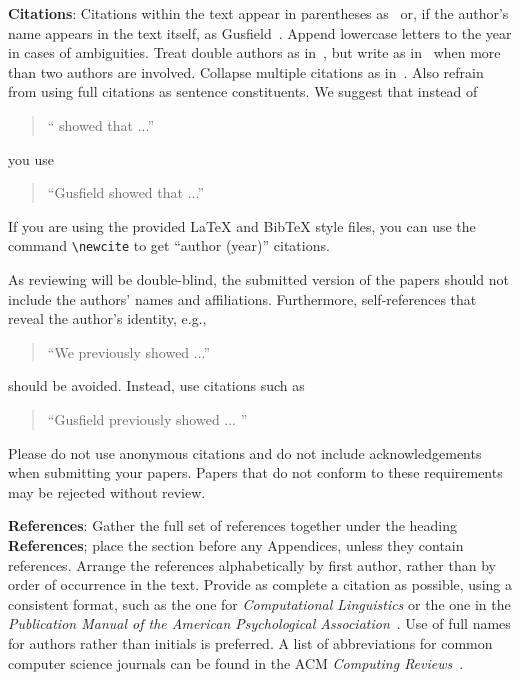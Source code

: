 \documentclass[11pt]{article}
\begin{document}
{\bf Citations}: Citations within the text appear
in parentheses as~\cite{Gusfield:97} or, if the author's name appears in
the text itself, as Gusfield~. Append lowercase letters to the year in cases of ambiguities. Treat double authors as in~\cite{Aho:72}, but write as in~\cite{Chandra:81} when more than two authors are involved. Collapse multiple citations as in~\cite{Gusfield:97,Aho:72}. Also refrain from using full citations as sentence constituents. We suggest that instead of
\begin{quote}
  ``\cite{Gusfield:97} showed that ...''
\end{quote}
you use
\begin{quote}
``Gusfield    showed that ...''
\end{quote}

If you are using the provided \LaTeX{} and Bib\TeX{} style files, you
can use the command \verb|\newcite| to get ``author (year)'' citations.

As reviewing will be double-blind, the submitted version of the papers should not include the
authors' names and affiliations. Furthermore, self-references that
reveal the author's identity, e.g.,
\begin{quote}
``We previously showed \cite{Gusfield:97} ...''
\end{quote}
should be avoided. Instead, use citations such as
\begin{quote}
``Gusfield 
previously showed ... ''
\end{quote}

Please do not  use anonymous
citations and  do not include acknowledgements when submitting your papers. Papers that do not conform
to these requirements may be rejected without review.

\textbf{References}: Gather the full set of references together under
the heading {\bf References}; place the section before any Appendices,
unless they contain references. Arrange the references alphabetically
by first author, rather than by order of occurrence in the text.
Provide as complete a citation as possible, using a consistent format,
such as the one for {\em Computational Linguistics\/} or the one in the
{\em Publication Manual of the American
Psychological Association\/}~\cite{APA:83}.  Use of full names for
authors rather than initials is preferred.  A list of abbreviations
for common computer science journals can be found in the ACM
{\em Computing Reviews\/}~\cite{ACM:83}.
\end{document}
